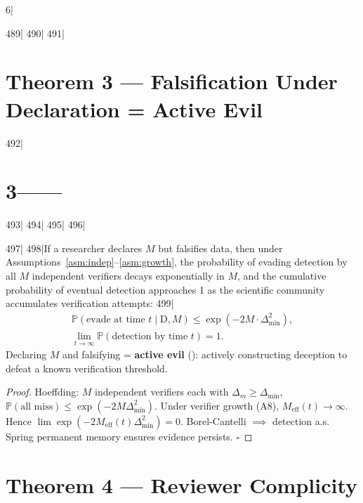 6|\documentclass[12pt,a4paper]{article}
\begin{document}
489|
490|%
491|\section{Theorem 3 — Falsification Under Declaration = Active Evil}
492|\section{3——}
493|\label{sec:thm3}
494|%
495|
496|\begin{theorem}
497|\label{thm:inevitability}
498|If a researcher declares $M$ but falsifies data, then under Assumptions~\ref{asm:indep}--\ref{asm:growth}, the probability of evading detection by all $M$ independent verifiers decays exponentially in $M$, and the cumulative probability of eventual detection approaches 1 as the scientific community accumulates verification attempts:
499|\begin{align}
    \mathbb{P}(\text{evade at time } t \mid \text{D}, M) \le \exp(-2M \cdot \Delta_{\min}^2), \\
    \lim_{t\to\infty} \mathbb{P}(\text{detection by time } t) = 1.
\end{align}
Declaring $M$ and falsifying = \textbf{active evil} (): actively constructing deception to defeat a known verification threshold.
\end{theorem}

\begin{proof}
Hoeffding: $M$ independent verifiers each with $\Delta_m \ge \Delta_{\min}$, $\mathbb{P}(\text{all miss}) \le \exp(-2M\Delta_{\min}^2)$. Under verifier growth (A8), $M_{\text{eff}}(t) \to \infty$. Hence $\lim \exp(-2M_{\text{eff}}(t)\Delta_{\min}^2) = 0$. Borel-Cantelli $\implies$ detection a.s. Spring permanent memory ensures evidence persists. $\square$
\end{proof}

\section{Theorem 4 — Reviewer Complicity }
\label{sec:reviewer-complicity}
\end{document}
